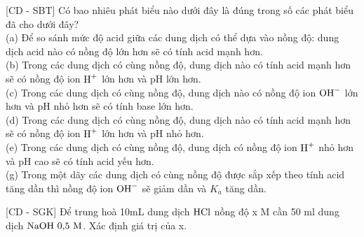 \documentclass[12pt,a4paper]{article}
\begin{document}
\begin{ex}
{[CD - SBT]} Có bao nhiêu phát biểu nào dưới đây là đúng trong số các phát biểu đã cho dưới đây?\\
(a) Để so sánh mức độ acid giữa các dung dịch có thể dựa vào nồng độ: dung dịch acid nào có nồng độ lớn hơn sẽ có tính acid mạnh hơn.\\
(b) Trong các dung dịch có cùng nồng độ, dung dịch nào có tính acid mạnh hơn sẽ có nồng độ ion $\ce{H+}$ lớn hơn và pH lớn hơn.\\
(c) Trong các dung dịch có cùng nồng độ, dung dịch nào có nồng độ ion $\ce{OH-}$ lớn hơn và pH nhỏ hơn sẽ có tính base lớn hơn.\\
(d) Trong các dung dịch có cùng nồng độ, dung dịch nào có tính acid mạnh hơn sẽ có nồng độ ion $\ce{H+}$ lớn hơn và pH nhỏ hơn.\\
(e) Trong các dung dịch có cùng nồng độ, dung dịch có nồng độ ion $\ce{H+}$ nhỏ hơn và pH cao sẽ có tính acid yếu hơn.\\
(g) Trong một dãy các dung dịch có cùng nồng độ được sắp xếp theo tính acid tăng dần thì nồng độ ion $\ce{OH-}$ sẽ giảm dần và $K_a$ tăng dần.
\end{ex}

\begin{ex}
{[CD - SGK]} Để trung hoà 10mL dung dịch $\ce{HCl}$ nồng độ x M cần 50 ml dung dịch $\ce{NaOH}\ 0{,}5\text{ M}$. Xác định giá trị của x.
\end{ex}
\end{document}
